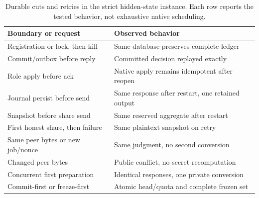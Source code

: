 \begin{table}[t]
\centering
\caption{Durable cuts and retries in the strict hidden-state instance. Each row reports the tested behavior, not exhaustive native scheduling.}
\label{tab:failure-cuts}
\footnotesize
\begin{tabularx}{\columnwidth}{@{}YY@{}}
\toprule
Boundary or request & Observed behavior \\
\midrule
Registration or lock, then kill & Same database preserves complete ledger \\
Commit/outbox before reply & Committed decision replayed exactly \\
Role apply before ack & Native apply remains idempotent after reopen \\
Journal persist before send & Same response after restart, one retained output \\
Snapshot before share send & Same reserved aggregate after restart \\
First honest share, then failure & Same plaintext snapshot on retry \\
Same peer bytes or new job/nonce & Same judgment, no second conversion \\
Changed peer bytes & Public conflict, no secret recomputation \\
Concurrent first preparation & Identical responses, one private conversion \\
Commit-first or freeze-first & Atomic head/quota and complete frozen set \\
\bottomrule
\end{tabularx}
\end{table}
